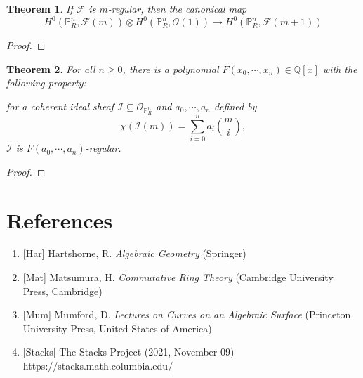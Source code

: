 \documentclass{article}
\theoremstyle{theorem}
\newtheorem{theorem}{Theorem}[section]
\begin{document}
    \begin{theorem}
        If $\mathcal F$ is $m$-regular, then the canonical map
        $$H^0(\mathbb P^n_R, \mathcal F(m)) \otimes H^0(\mathbb P^n_R, \mathcal O(1)) \rightarrow H^0(\mathbb P^n_R, \mathcal F(m+1))$$
    \end{theorem}
    \begin{proof}
    \end{proof}

    \begin{theorem}
        For all $n \geq 0$, there is a polynomial $F(x_0, \cdots, x_n) \in \mathbb Q[x]$ with the following property:
        
        for a coherent ideal sheaf $\mathcal I \subseteq \mathcal O_{\mathbb P^n_R}$ and $a_0, \cdots, a_n$ defined by $$\displaystyle \chi(\mathcal I(m)) = \sum_{i = 0}^{n} a_i\binom{m}{i},$$
        $\mathcal I$ is $F(a_0, \cdots, a_n)$-regular.
    \end{theorem}
    \begin{proof}
        
    \end{proof}
    
    \section{References}
    \begin{enumerate}[]
        \item {[Har]} Hartshorne, R. {\it Algebraic Geometry} (Springer)
        \item {[Mat]} Matsumura, H. {\it Commutative Ring Theory} (Cambridge University Press, Cambridge)
        \item {[Mum]} Mumford, D. {\it Lectures on Curves on an Algebraic Surface} (Princeton University Press, United States of America)
        \item {[Stacks]} The Stacks Project (2021, November 09) https://stacks.math.columbia.edu/
    \end{enumerate}
\end{document}
